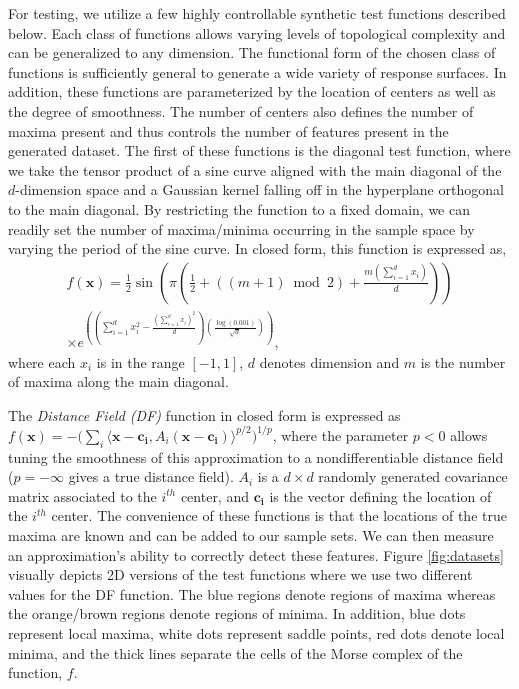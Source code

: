 For testing, we utilize a few highly controllable synthetic test functions described below.
%
Each class of functions allows varying levels of topological complexity and can be generalized to any dimension.
%
The functional form of the chosen class of functions is sufficiently general to generate a wide variety of response surfaces.
%
In addition, these functions are parameterized by the location of centers as well as the degree of smoothness.
%
The number of centers also defines the number of maxima present and thus controls the number of features present in the generated dataset.
%
The first of these functions is the diagonal test function, where we take the tensor product of a sine curve aligned with the main diagonal of the $d$-dimension space and a Gaussian kernel falling off in the hyperplane orthogonal to the main diagonal.
%
By restricting the function to a fixed domain, we can readily set the number of maxima/minima occurring in the sample space by varying the period of the sine curve.
%
In closed form, this function is expressed as,
%
\begin{eqnarray*}
    f(\mathbf{x}) = \frac{1}{2}\sin\left(\pi\left(\frac{1}{2} + \left((m+1)
      \bmod{2}\right) + \frac{m\left(\sum_{i=1}^{d}x_i\right)}{d}\right)\right)
    \\
     \times e^{\left(\left(\sum_{i=1}^{d}x_i^2 -\frac{\left(\sum_{i=1}^{d}
      x_i\right)^2}{d}\right)\left(\frac{\log(0.001)}{\sqrt{d}}\right)\right)},
\end{eqnarray*}
%
where each $x_i$ is in the range $[-1,1]$, $d$ denotes dimension and $m$ is the number of maxima along the main diagonal.

The \emph{Distance Field (DF)} function in closed form is expressed as $f(\mathbf{x}) = -\bigl(\sum_i \langle\mathbf{x}-\mathbf{c_i},A_i(\mathbf{x}-\mathbf{c_i})\rangle^{p/2}\bigr)^{1/p}$, where the parameter $p < 0$ allows tuning the smoothness of this approximation to a nondifferentiable distance field ($p = -\infty$ gives a true distance field).
%
$A_i$ is a $d \times d$ randomly generated covariance matrix associated to the $i^{th}$ center, and $\mathbf{c_i}$ is the vector defining the location of the $i^{th}$ center.
%
The convenience of these functions is that the locations of the true maxima are known and can be added to our sample sets.
%
We can then measure an approximation's ability to correctly detect these features.
%
Figure \ref{fig:datasets} visually depicts 2D versions of the test functions where we use two different values for the DF function.
%
The blue regions denote regions of maxima whereas the orange/brown regions denote regions of minima.
In addition, blue dots represent local maxima, white dots represent saddle points, red dots denote local minima, and the thick lines separate the cells of the Morse complex of the function, $f$.

